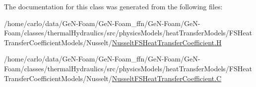 The documentation for this class was generated from the following files\+:\begin{DoxyCompactItemize}
\item 
/home/carlo/data/\+Ge\+N-\/\+Foam/\+Ge\+N-\/\+Foam\+\_\+ffn/\+Ge\+N-\/\+Foam/\+Ge\+N-\/\+Foam/classes/thermal\+Hydraulics/src/physics\+Models/heat\+Transfer\+Models/\+F\+S\+Heat\+Transfer\+Coefficient\+Models/\+Nusselt/\hyperlink{NusseltFSHeatTransferCoefficient_8H}{Nusselt\+F\+S\+Heat\+Transfer\+Coefficient.\+H}\item 
/home/carlo/data/\+Ge\+N-\/\+Foam/\+Ge\+N-\/\+Foam\+\_\+ffn/\+Ge\+N-\/\+Foam/\+Ge\+N-\/\+Foam/classes/thermal\+Hydraulics/src/physics\+Models/heat\+Transfer\+Models/\+F\+S\+Heat\+Transfer\+Coefficient\+Models/\+Nusselt/\hyperlink{NusseltFSHeatTransferCoefficient_8C}{Nusselt\+F\+S\+Heat\+Transfer\+Coefficient.\+C}\end{DoxyCompactItemize}
